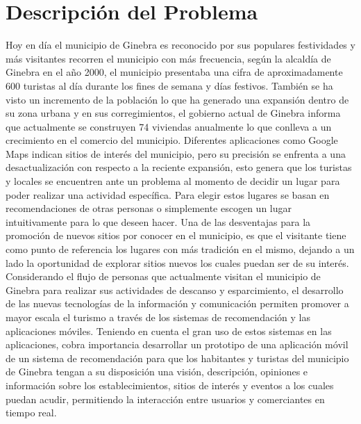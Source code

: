 \documentclass[12pt,letterpaper,openany]{book}
\begin{document}
\section{Descripción del Problema}
Hoy en día el municipio de Ginebra es reconocido por sus populares festividades y más visitantes recorren el municipio con más frecuencia, según la alcaldía de Ginebra en el año 2000, el municipio presentaba una cifra de aproximadamente 600 turistas al día durante los fines de semana y días festivos\cite{3}. También se ha visto un incremento de la población lo que ha generado una expansión dentro de su zona urbana y en sus corregimientos, el gobierno actual de Ginebra informa que actualmente se construyen 74 viviendas\cite{4} anualmente lo que conlleva a un crecimiento en el comercio del municipio. Diferentes aplicaciones como Google Maps indican sitios de interés del municipio, pero su precisión se enfrenta a una desactualización con respecto a la reciente expansión, esto genera que los turistas y locales se encuentren ante un problema al momento de decidir un lugar para poder realizar una actividad específica. Para elegir estos lugares se basan en recomendaciones de otras personas o simplemente escogen un lugar intuitivamente para lo que deseen hacer. 
\vspace{5mm}\newline
Una de las desventajas para la promoción de nuevos sitios por conocer en el municipio, es que el visitante tiene como punto de referencia los lugares con más tradición en el mismo, dejando a un lado la oportunidad de explorar sitios nuevos los cuales puedan ser de su interés.
\vspace{5mm}\newline
Considerando el flujo de personas que actualmente visitan el municipio de Ginebra para realizar sus actividades de descanso y esparcimiento, el desarrollo de las nuevas tecnologías de la información y comunicación permiten promover a mayor escala el turismo a través de los sistemas de recomendación y las aplicaciones móviles.
\vspace{5mm}\newline
Teniendo en cuenta el gran uso de estos sistemas en las aplicaciones\cite{5}, cobra importancia desarrollar un prototipo de una aplicación móvil de un sistema de recomendación para que los habitantes y turistas del municipio de Ginebra tengan a su disposición una visión, descripción, opiniones e información sobre los establecimientos, sitios de interés y eventos a los cuales puedan acudir, permitiendo la interacción entre usuarios y comerciantes en tiempo real.
\end{document}

